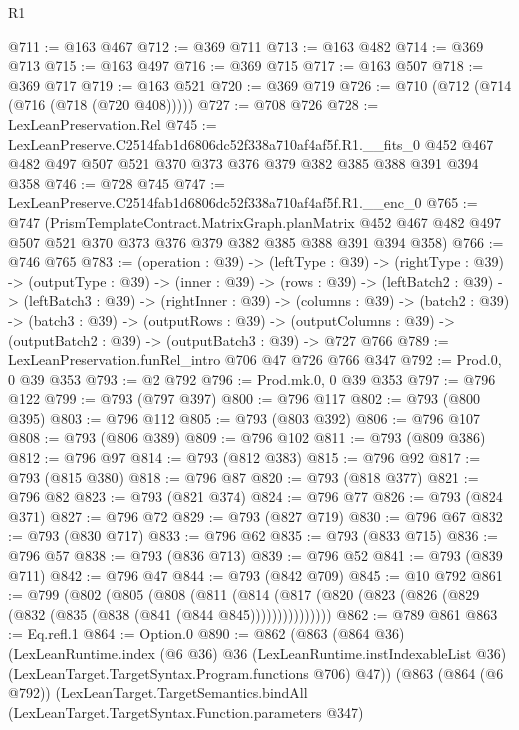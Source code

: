 \begin{lexlean}{R1}
\begin{coremodule}
@711 := @163 @467
@712 := @369 @711
@713 := @163 @482
@714 := @369 @713
@715 := @163 @497
@716 := @369 @715
@717 := @163 @507
@718 := @369 @717
@719 := @163 @521
@720 := @369 @719
@726 := @710 (@712 (@714 (@716 (@718 (@720 @408)))))
@727 := @708 @726
@728 := LexLeanPreservation.Rel
@745 := LexLeanPreserve.C2514fab1d6806dc52f338a710af4af5f.R1.__fits_0
    @452
    @467
    @482
    @497
    @507
    @521
    @370
    @373
    @376
    @379
    @382
    @385
    @388
    @391
    @394
    @358
@746 := @728 @745
@747 := LexLeanPreserve.C2514fab1d6806dc52f338a710af4af5f.R1.__enc_0
@765 := @747
    (PrismTemplateContract.MatrixGraph.planMatrix
      @452
      @467
      @482
      @497
      @507
      @521
      @370
      @373
      @376
      @379
      @382
      @385
      @388
      @391
      @394
      @358)
@766 := @746 @765
@783 := (operation : @39) ->
  (leftType : @39) ->
  (rightType : @39) ->
  (outputType : @39) ->
  (inner : @39) ->
  (rows : @39) ->
  (leftBatch2 : @39) ->
  (leftBatch3 : @39) ->
  (rightInner : @39) ->
  (columns : @39) ->
  (batch2 : @39) ->
  (batch3 : @39) ->
  (outputRows : @39) ->
  (outputColumns : @39) -> (outputBatch2 : @39) -> (outputBatch3 : @39) -> @727 @766
@789 := LexLeanPreservation.funRel_intro @706 @47 @726 @766 @347
@792 := Prod.{0, 0} @39 @353
@793 := @2 @792
@796 := Prod.mk.{0, 0} @39 @353
@797 := @796 @122
@799 := @793 (@797 @397)
@800 := @796 @117
@802 := @793 (@800 @395)
@803 := @796 @112
@805 := @793 (@803 @392)
@806 := @796 @107
@808 := @793 (@806 @389)
@809 := @796 @102
@811 := @793 (@809 @386)
@812 := @796 @97
@814 := @793 (@812 @383)
@815 := @796 @92
@817 := @793 (@815 @380)
@818 := @796 @87
@820 := @793 (@818 @377)
@821 := @796 @82
@823 := @793 (@821 @374)
@824 := @796 @77
@826 := @793 (@824 @371)
@827 := @796 @72
@829 := @793 (@827 @719)
@830 := @796 @67
@832 := @793 (@830 @717)
@833 := @796 @62
@835 := @793 (@833 @715)
@836 := @796 @57
@838 := @793 (@836 @713)
@839 := @796 @52
@841 := @793 (@839 @711)
@842 := @796 @47
@844 := @793 (@842 @709)
@845 := @10 @792
@861 := @799
    (@802
      (@805
        (@808
          (@811
            (@814 (@817 (@820 (@823 (@826 (@829 (@832 (@835 (@838 (@841 (@844 @845)))))))))))))))
@862 := @789 @861
@863 := Eq.refl.{1}
@864 := Option.{0}
@890 := @862
    (@863
      (@864 @36)
      (LexLeanRuntime.index
        (@6 @36)
        @36
        (LexLeanRuntime.instIndexableList @36)
        (LexLeanTarget.TargetSyntax.Program.functions @706)
        @47))
    (@863
      (@864 (@6 @792))
      (LexLeanTarget.TargetSemantics.bindAll
        (LexLeanTarget.TargetSyntax.Function.parameters @347)

\end{coremodule}
\end{lexlean}
